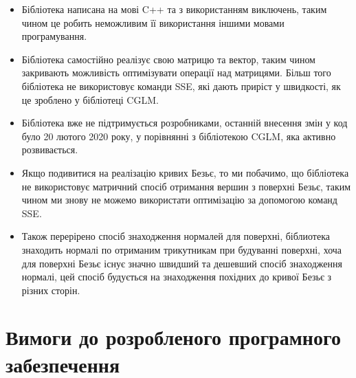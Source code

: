 \let\mypdfximage\pdfximage\def\pdfximage{\immediate\mypdfximage}\documentclass[14pt,a4paper]{extarticle}
\theoremstyle{definition}
\renewcommand{\[}{\begin{singlespace}\begin{equation*}}
\renewcommand{\]}{\end{equation*}\end{singlespace}}
\renewcommand{\+}{\discretionary{\mbox{\scriptsize$\hookleftarrow$}}{}{}}
\begin{document}
\begin{itemize}
\item Бібліотека написана на мові C++ та з використанням виключень, таким чином це робить неможливим її використання іншими мовами програмування.
\item Бібліотека самостійно реалізує свою матрицю та вектор, таким чином закривають можливість оптимізувати операції над матрицями. Більш того бібліотека не  використовує команди SSE, які дають приріст у швидкості, як це зроблено у бібліотеці CGLM.
\item Бібліотека вже не підтримується розробниками, останній внесення змін у код було 20 лютого 2020 року, у порівнянні з бібліотекою CGLM, яка активно розвивається.
\item Якщо подивитися на реалізацію кривих Безьє, то ми побачимо, що бібліотека не використовує матричний спосіб отримання вершин з поверхні Безьє, таким чином ми знову не можемо використати оптимізацію за допомогою команд SSE.
\item Також перерірено спосіб знаходження нормалей для поверхні, біблиотека знаходить нормалі по отриманим трикутникам при будуванні поверхні, хоча для поверхні Безьє існує значно швидший та дешевший спосіб знаходження нормалі, цей спосіб будується на знаходження похідних до кривої Безьє з різних сторін.
\end{itemize}

\section{Вимоги до розробленого програмного забезпечення}
\end{document}
